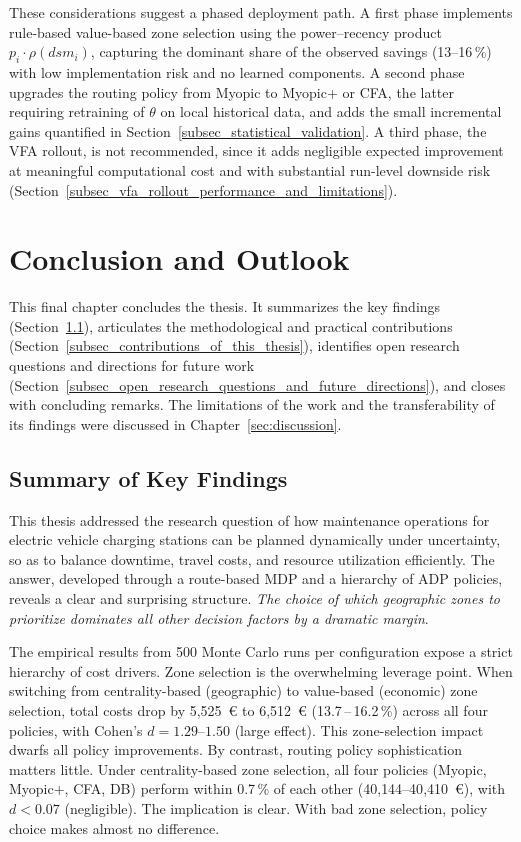 \documentclass[12pt,oneside]{article}
\begin{document}
These considerations suggest a phased deployment path. A first phase implements rule-based value-based zone selection using the power--recency product $p_i \cdot \rho(\mathit{dsm}_i)$, capturing the dominant share of the observed savings (13--16\,\%) with low implementation risk and no learned components. A second phase upgrades the routing policy from Myopic to Myopic+ or CFA, the latter requiring retraining of $\theta$ on local historical data, and adds the small incremental gains quantified in Section~\ref{subsec_statistical_validation}. A third phase, the VFA rollout, is not recommended, since it adds negligible expected improvement at meaningful computational cost and with substantial run-level downside risk (Section~\ref{subsec_vfa_rollout_performance_and_limitations}).


\section{Conclusion and Outlook}\label{sec:outlook}

This final chapter concludes the thesis. It summarizes the key findings (Section~\ref{subsec_summary_of_key_findings}), articulates the methodological and practical contributions (Section~\ref{subsec_contributions_of_this_thesis}), identifies open research questions and directions for future work (Section~\ref{subsec_open_research_questions_and_future_directions}), and closes with concluding remarks. The limitations of the work and the transferability of its findings were discussed in Chapter~\ref{sec:discussion}.

\subsection{Summary of Key Findings}\label{subsec_summary_of_key_findings}

This thesis addressed the research question of how maintenance operations for electric vehicle charging stations can be planned dynamically under uncertainty, so as to balance downtime, travel costs, and resource utilization efficiently. The answer, developed through a route-based MDP and a hierarchy of ADP policies, reveals a clear and surprising structure. \emph{The choice of which geographic zones to prioritize dominates all other decision factors by a dramatic margin}.

The empirical results from 500 Monte Carlo runs per configuration expose a strict hierarchy of cost drivers. Zone selection is the overwhelming leverage point. When switching from centrality-based (geographic) to value-based (economic) zone selection, total costs drop by 5{,}525~€ to 6{,}512~€ (13.7\,--\,16.2\,\%) across all four policies, with Cohen's $d = 1.29$--$1.50$ (large effect). This zone-selection impact dwarfs all policy improvements. By contrast, routing policy sophistication matters little. Under centrality-based zone selection, all four policies (Myopic, Myopic+, CFA, DB) perform within 0.7\,\% of each other (40{,}144--40{,}410~€), with $d < 0.07$ (negligible). The implication is clear. With bad zone selection, policy choice makes almost no difference.
\end{document}
